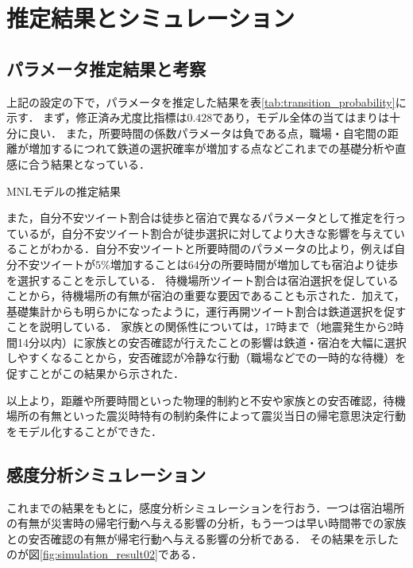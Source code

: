 \documentclass[japanese]{jnlp_1.4}
\begin{document}
\section{推定結果とシミュレーション}

\subsection{パラメータ推定結果と考察}

上記の設定の下で，パラメータを推定した結果を表\ref{tab:transition_probability}に示す．
まず，修正済み尤度比指標は$0.428$であり，モデル全体の当てはまりは十分に良い．
また，所要時間の係数パラメータは負である点，職場・自宅間の距離が増加するにつれて鉄道の選択確率が増加する点などこれまでの基礎分析や直感に合う結果となっている．

\begin{table}[b]
\caption{MNLモデルの推定結果}
\label{tab:transition_probability}

\end{table}

また，自分不安ツイート割合は徒歩と宿泊で異なるパラメータとして推定を行っているが，自分不安ツイート割合が徒歩選択に対してより大きな影響を与えていることがわかる．自分不安ツイートと所要時間のパラメータの比より，例えば自分不安ツイートが$5\%$増加することは$64$分の所要時間が増加しても宿泊より徒歩を選択することを示している．
待機場所ツイート割合は宿泊選択を促していることから，待機場所の有無が宿泊の重要な要因であることも示された．加えて，基礎集計からも明らかになったように，運行再開ツイート割合は鉄道選択を促すことを説明している．
家族との関係性については，17時まで（地震発生から2時間14分以内）に家族との安否確認が行えたことの影響は鉄道・宿泊を大幅に選択しやすくなることから，安否確認が冷静な行動（職場などでの一時的な待機）を促すことがこの結果から示された．

以上より，距離や所要時間といった物理的制約と不安や家族との安否確認，待機場所の有無といった震災時特有の制約条件によって震災当日の帰宅意思決定行動をモデル化することができた．


\subsection{感度分析シミュレーション}

これまでの結果をもとに，感度分析シミュレーションを行おう．一つは宿泊場所の有無が災害時の帰宅行動へ与える影響の分析，もう一つは早い時間帯での家族との安否確認の有無が帰宅行動へ与える影響の分析である．
その結果を示したのが図\ref{fig:simulation_result02}である．
\end{document}

